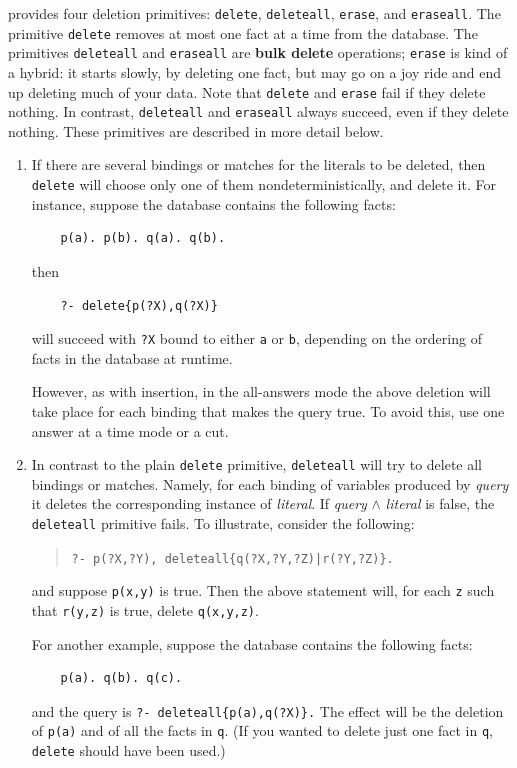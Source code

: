 \documentclass[11pt]{article}
\newcommand{\ERGO}{\mbox{\smaller{\ensuremath{\cal{E}}\smaller{{\sc{RGO}}}}}\xspace}
\newcommand{\FLSYSTEM}{\ERGO}
\begin{document}
\FLSYSTEM provides four deletion primitives: {\tt delete}, {\tt deleteall},
{\tt erase}, and {\tt eraseall}. The primitive {\tt delete} removes at most
one fact at a time from the database. The primitives {\tt deleteall} and
{\tt eraseall} are {\bf bulk delete} operations; {\tt erase} is kind of a
hybrid: it starts slowly, by deleting one fact, but may go on a joy ride
and end up deleting much of your data.
Note that \texttt{delete} and \texttt{erase} fail if they delete nothing.
In contrast, \texttt{deleteall} and \texttt{eraseall} always succeed, even
if they delete nothing.  
These primitives are described in more detail
below.
\begin{enumerate}
\item If there are several bindings or matches for the literals to be
  deleted, then {\tt delete} will choose only one of them
  nondeterministically, and delete it.  For instance, suppose the database
  contains the following facts:
  \begin{verbatim}
    p(a). p(b). q(a). q(b).
  \end{verbatim}
  then
  \begin{verbatim}
    ?- delete{p(?X),q(?X)}
  \end{verbatim}
  will succeed with {\tt ?X} bound to either {\tt a} or {\tt b},
  depending on the ordering of facts in the database at runtime.

  However, as with insertion, in the all-answers mode the above deletion
  will take place for each binding that makes the query true. To avoid
  this, use one answer at a time mode or a cut.
      
\item In contrast to the plain {\tt delete} primitive, {\tt deleteall} will
  try to delete all bindings or matches.  Namely, for each binding of
  variables produced by \emph{query} it deletes the corresponding instance
  of \emph{literal}. If \emph{query} $\wedge$ \emph{literal} is false, the
  {\tt deleteall} primitive fails.  To illustrate, consider the following:
  \begin{quote}
    {\tt ?- p(?X,?Y), deleteall\{q(?X,?Y,?Z)|r(?Y,?Z)\}.}
  \end{quote}
  and suppose {\tt p(x,y)} is true. Then the above statement will, for
  each {\tt z} such that {\tt r(y,z)} is true,
  delete {\tt q(x,y,z)}.
  
  For another example, suppose the database contains the following facts:
  \begin{verbatim}
    p(a). q(b). q(c).
  \end{verbatim}
  and the query is {\tt ?- deleteall\{p(a),q(?X)\}.} The effect will be 
  the deletion of {\tt p(a)} and of all the facts in {\tt q}. (If you
  wanted to delete just one fact in {\tt q}, {\tt delete} should
  have been used.)
  

\end{enumerate}
\end{document}
